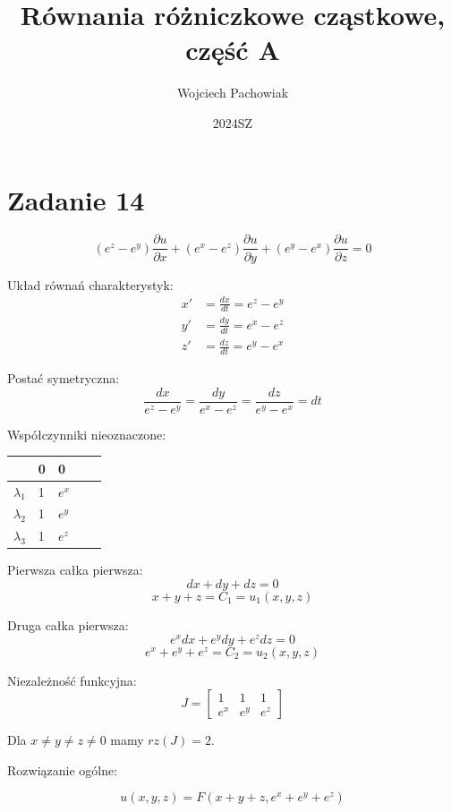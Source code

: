 \documentclass{article}
\title{Równania różniczkowe cząstkowe, część A}
\author{Wojciech Pachowiak}
\date{2024SZ}
\begin{document}

\break

\section*{Zadanie 14}
$$ 
(e^z - e^y)\frac{\partial{u}}{\partial{x}} +
(e^x - e^z)\frac{\partial{u}}{\partial{y}} +
(e^y - e^x)\frac{\partial{u}}{\partial{z}}
= 0
$$


Układ równań charakterystyk:
\begin{align*}
    x' &= \frac{dx}{dt} = e^z - e^y  \\
    y' &= \frac{dy}{dt} = e^x - e^z  \\
    z' &= \frac{dz}{dt} = e^y - e^x
\end{align*}


Postać symetryczna:
$$
\frac{dx}{e^z - e^y} = \frac{dy}{e^x - e^z} = \frac{dz}{e^y - e^x} = dt
$$


Współczynniki nieoznaczone:
\begin{table}[h]
\begin{tabular}{@{}lllll@{}}
\toprule
                          & 0 & 0                      \\ \midrule
$\lambda_1$ & 1 & $e^x$    \\
$\lambda_2$ & 1 & $e^y$     \\
$\lambda_3$ & 1 & $e^z$    \\ \bottomrule
\end{tabular}
\end{table}

Pierwsza całka pierwsza:
$$dx + dy + dz = 0$$
$$ x+y+z = C_1 = u_1(x,y,z)  $$

Druga całka pierwsza:
$$ e^xdx + e^ydy + e^zdz = 0 $$
$$ e^x + e^y + e^z =  C_2 =  u_2(x,y,z) $$



Niezależność funkcyjna: 
$$
J =
\begin{bmatrix}
   1 & 1 & 1 \\ e^x & e^y & e^z 
\end{bmatrix}
$$

Dla $x \ne y \ne z \ne 0$ mamy $rz(J) = 2$.

\bigskip


Rozwiązanie ogólne:

$$ u(x,y,z) = F(x+y+z, e^x + e^y + e^z) $$
\end{document}
